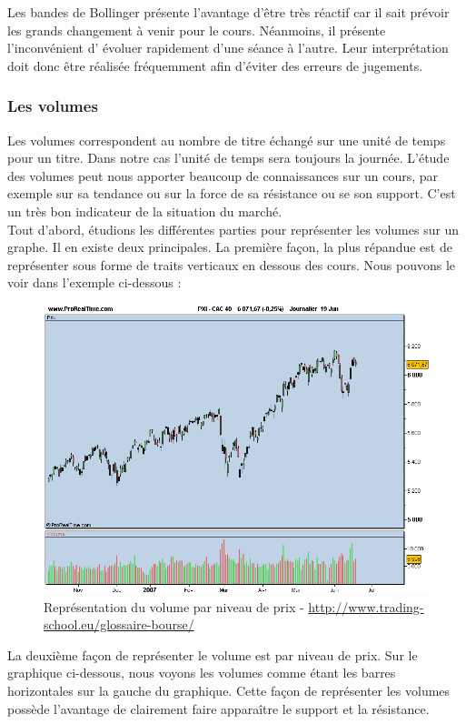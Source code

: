 Les bandes de Bollinger présente l'avantage d'être très réactif car il sait prévoir les grands changement à venir pour le cours. Néanmoins, il présente l'inconvénient d' évoluer rapidement d'une séance à l'autre. Leur interprétation doit donc être réalisée fréquemment afin d'éviter des erreurs de jugements.  

\subsubsection{Les volumes}
Les volumes correspondent au nombre de titre échangé sur une unité de temps pour un titre. Dans notre cas l'unité de temps sera toujours la journée. L'étude des volumes peut nous apporter beaucoup de connaissances sur un cours, par exemple sur sa tendance ou sur la force de sa résistance ou se son support. C'est un très bon indicateur de la situation du marché. \\

Tout d'abord, étudions les différentes parties pour représenter les volumes sur un graphe. Il en existe deux principales. La première façon, la plus répandue est de représenter sous forme de traits verticaux en dessous des cours. Nous pouvons le voir dans l'exemple ci-dessous : 

\begin{figure}[H]
  \center
  \includegraphics[scale=0.5]{../graph/volumeBarre.png} 
  \caption{Représentation du volume par niveau de prix - \url{http://www.trading-school.eu/glossaire-bourse/}}
\end{figure} 

La deuxième façon de représenter le volume est par niveau de prix. Sur le graphique ci-dessous, nous voyons les volumes comme étant les barres horizontales sur la gauche du graphique. Cette façon de représenter les volumes possède l'avantage de clairement faire apparaître le support et la résistance. 

